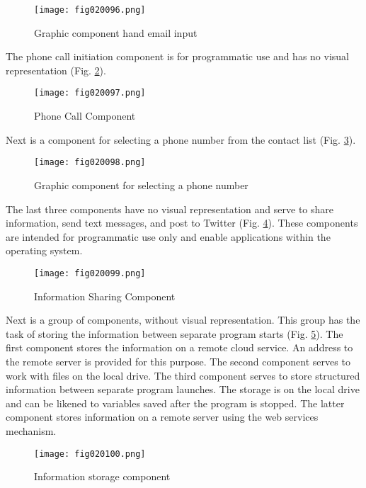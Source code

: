 \begin{figure}[H]
   \centering
   \texttt{[image: fig020096.png]}
   \caption{Graphic component hand email input}
\label{fig020096}
\end{figure}

The phone call initiation component is for programmatic use and has no visual representation (Fig. \ref{fig020097}).

\begin{figure}[H]
   \centering
   \texttt{[image: fig020097.png]}
   \caption{Phone Call Component}
\label{fig020097}
\end{figure}

Next is a component for selecting a phone number from the contact list (Fig. \ref{fig020098}).

\begin{figure}[H]
   \centering
   \texttt{[image: fig020098.png]}
   \caption{Graphic component for selecting a phone number}
\label{fig020098}
\end{figure}

The last three components have no visual representation and serve to share information, send text messages, and post to Twitter (Fig. \ref{fig020099}). These components are intended for programmatic use only and enable applications within the operating system.

\begin{figure}[H]
   \centering
   \texttt{[image: fig020099.png]}
   \caption{Information Sharing Component}
\label{fig020099}
\end{figure}

Next is a group of components, without visual representation. This group has the task of storing the information between separate program starts (Fig. \ref{fig020100}). The first component stores the information on a remote cloud service. An address to the remote server is provided for this purpose. The second component serves to work with files on the local drive. The third component serves to store structured information between separate program launches. The storage is on the local drive and can be likened to variables saved after the program is stopped. The latter component stores information on a remote server using the web services mechanism.

\begin{figure}[H]
   \centering
   \texttt{[image: fig020100.png]}
   \caption{Information storage component}
\label{fig020100}
\end{figure}

